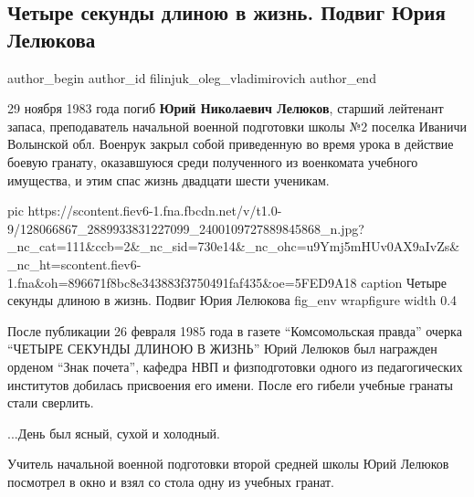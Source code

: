  
 
 
 
 
 
\subsection{Четыре секунды длиною в жизнь. Подвиг Юрия Лелюкова}
\label{sec:29_11_2020.fb.filinjuk_oleg_vladimirovich.1.podvig_jurija_lelukova}
\ifcmt
	author_begin
   author_id filinjuk_oleg_vladimirovich
	author_end
\fi


29 ноября 1983 года погиб \textbf{Юрий Николаевич Лелюков}, старший лейтенант запаса,
преподаватель начальной военной подготовки школы №2 поселка Иваничи Волынской
обл. Военрук закрыл собой приведенную во время урока в действие боевую гранату,
оказавшуюся среди полученного из военкомата учебного имущества, и этим спас
жизнь двадцати шести ученикам.

\ifcmt
pic https://scontent.fiev6-1.fna.fbcdn.net/v/t1.0-9/128066867_2889933831227099_2400109727889845868_n.jpg?_nc_cat=111&ccb=2&_nc_sid=730e14&_nc_ohc=u9Ymj5mHUv0AX9aIvZs&_nc_ht=scontent.fiev6-1.fna&oh=896671f8bc8e343883f3750491faf435&oe=5FED9A18
caption Четыре секунды длиною в жизнь. Подвиг Юрия Лелюкова
fig_env wrapfigure
width 0.4
\fi

После публикации 26 февраля 1985 года в газете \enquote{Комсомольская правда} очерка
\enquote{ЧЕТЫРЕ СЕКУНДЫ ДЛИНОЮ В ЖИЗНЬ} Юрий Лелюков был награжден орденом \enquote{Знак почета}, 
кафедра НВП и физподготовки одного из педагогических институтов
добилась присвоения его имени. После его гибели учебные гранаты стали сверлить.

...День был ясный, сухой и холодный.

Учитель начальной военной подготовки второй средней школы Юрий Лелюков
посмотрел в окно и взял со стола одну из учебных гранат.

